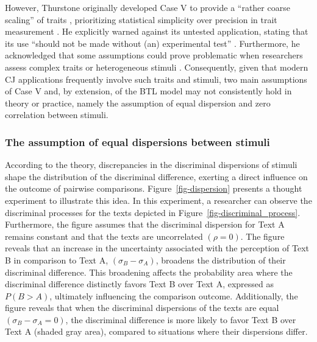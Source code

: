 \documentclass[
  authoryear,
  review,
  1p]{elsarticle}
\begin{document}
However, Thurstone originally developed Case V to provide a ``rather
coarse scaling'' of traits \citep[pp.~269]{Thurstone_1927b},
prioritizing statistical simplicity over precision in trait measurement
\citep[pp.~677]{Kelly_et_al_2022}. He explicitly warned against its
untested application, stating that its use ``should not be made without
(an) experimental test'' \citep[pp.~270]{Thurstone_1927b}. Furthermore,
he acknowledged that some assumptions could prove problematic when
researchers assess complex traits or heterogeneous stimuli
\citep[pp.~376]{Thurstone_1927a}. Consequently, given that modern CJ
applications frequently involve such traits and stimuli, two main
assumptions of Case V and, by extension, of the BTL model may not
consistently hold in theory or practice, namely the assumption of equal
dispersion and zero correlation between stimuli.

\subsubsection{The assumption of equal dispersions between
stimuli}\label{sec-theory-issue1a}

According to the theory, discrepancies in the discriminal dispersions of
stimuli shape the distribution of the discriminal difference, exerting a
direct influence on the outcome of pairwise comparisons.
Figure~\ref{fig-dispersion} presents a thought experiment to illustrate
this idea. In this experiment, a researcher can observe the discriminal
processes for the texts depicted in
Figure~\ref{fig-discriminal_process}. Furthermore, the figure assumes
that the discriminal dispersion for Text A remains constant and that the
texts are uncorrelated \((\rho=0)\). The figure reveals that an increase
in the uncertainty associated with the perception of Text B in
comparison to Text A, \((\sigma_{B}-\sigma_{A})\), broadens the
distribution of their discriminal difference. This broadening affects
the probability area where the discriminal difference distinctly favors
Text B over Text A, expressed as \(P(B > A)\), ultimately influencing
the comparison outcome. Additionally, the figure reveals that when the
discriminal dispersions of the texts are equal
\((\sigma_{B}-\sigma_{A}=0)\), the discriminal difference is more likely
to favor Text B over Text A (shaded gray area), compared to situations
where their dispersions differ.
\end{document}
